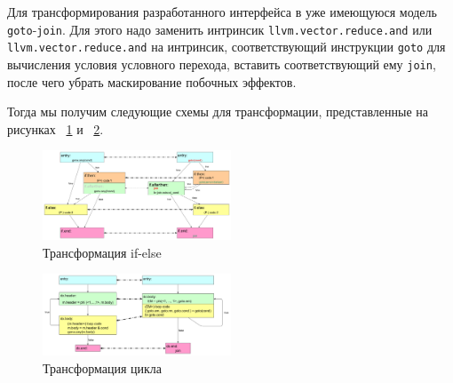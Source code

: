 Для трансформирования разработанного интерфейса в уже имеющуюся модель
\texttt{goto}-\texttt{join}. Для этого надо заменить интринсик
\texttt{llvm.vector.reduce.and} или \texttt{llvm.vector.reduce.and} на
интринсик, соответствующий инструкции \texttt{goto} для вычисления условия
условного перехода, вставить соответствующий ему \texttt{join},
после чего убрать маскирование побочных эффектов.

Тогда мы получим следующие схемы для трансформации, представленные на рисунках
~\ref{fig:if-transform} и ~\ref{fig:loop-transform}.
\begin{figure}
  \centering
  \includegraphics[width=0.5\textwidth]{Images/if-else-BE.png}
  \caption{Трансформация if-else}
  \label{fig:if-transform}
\end{figure}
\begin{figure}
  \centering
  \includegraphics[width=0.5\textwidth]{Images/do-while-BE.png}
  \caption{Трансформация цикла}
  \label{fig:loop-transform}
\end{figure}
